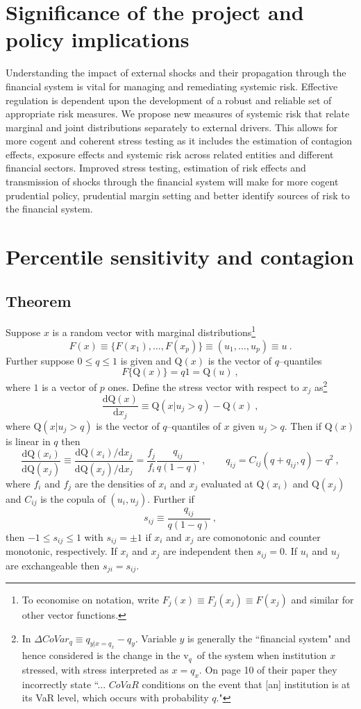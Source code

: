 \documentclass[authoryear]{elsarticle}
\newcommand{\de}{\mathrm{d}}
\renewcommand{\v}{\ensuremath{\mathrm{v}_q}}
\newcommand{\cq}{\ , \qquad}
\newcommand{\be}[1]{\begin{equation}\label{#1}}
\newcommand{\ee}{\end{equation}}
\begin{document}
\section{Significance of the project and  policy implications}

Understanding the impact of external shocks and their propagation through   the financial system is vital for managing and remediating systemic risk. Effective regulation is dependent upon the development of a robust and reliable set of appropriate risk measures.  We propose new measures of systemic risk that relate marginal and joint distributions separately to external drivers. This allows for more cogent and coherent stress testing as it includes the estimation of contagion effects, exposure effects and systemic risk across related entities and different financial sectors. Improved stress testing, estimation of risk effects and transmission of shocks through the financial system will make for more cogent prudential policy, prudential margin setting and better identify sources of risk to the financial system.

\newcommand{\q}{\mathrm{Q}}
\section{Percentile sensitivity and contagion}\label{perc}

\subsection{Theorem}  Suppose $x$ is a random vector with marginal distributions\footnote{To economise on notation, write $F_j(x)\equiv F_j(x_j)\equiv F(x_j)$ and similar for other vector functions.} 
$$
F(x)\equiv \{F(x_1),\ldots ,F(x_p)\} \equiv (u_1,\ldots,u_p)\equiv u\ .
$$ 
Further suppose $0\le q\le 1$ is given and  $\q(x)$ is the vector of $q$--quantiles
$$
F\{\q(x)\}=q1=\q(u)\ ,
$$
where $1$ is a vector of $p$ ones. 
Define the stress vector with respect to $x_j$ as\footnote{In \cite{adrian2011covar}  $\Delta CoVar_q\equiv q_{y|x=q_x}-q_y$.  Variable $y$  is generally the ``financial system" and hence considered is the change in the \v\ of the system when institution $x$ stressed, with stress  interpreted as $x=q_x$.  On page 10 of their paper they incorrectly state ``... $CoVaR$ conditions on the event that [an] institution is at its VaR level, which occurs with probability $q$."} 
\be{stress}
\frac{\de\q(x)}{\de x_j} \equiv \q(x|u_j>q) - \q(x)\ ,
\ee
where $\q(x|u_j>q)$ is the vector of $q$--quantiles of $x$ given $u_j>q$.    Then if $\q(x)$  is linear in $q$ 
 then
\be{implicit}
\frac{\de\q(x_i)}{\de\q(x_j)} \equiv \frac{\de\q(x_i)/\de x_j}{\de\q(x_j)/\de x_j} =  
\frac{f_j}{f_i} 
 \frac{q_{ij}}{q(1-q)}\cq q_{ij}=C_{ij}(q+q_{ij},q) - q^2\ ,
\ee
where $f_i$ and $f_j$ are the densities of $x_i$ and $x_j$ evaluated at $\q(x_i)$ and $\q(x_j)$ and  $C_{ij}$ is the copula of $(u_i,u_j)$.   
Further if 
$$
s_{ij}\equiv \frac{q_{ij}}{q(1-q)}\ ,
$$ then  $-1\le s_{ij}\le 1$ with $s_{ij}=\pm 1$ if $x_i$ and $x_j$ are comonotonic and counter monotonic, respectively.  If $x_i$ and $x_j$ are independent then  $s_{ij}=0$. If $u_i$ and $u_j$ are exchangeable  then  $s_{ji}=s_{ij}$.
\end{document}
